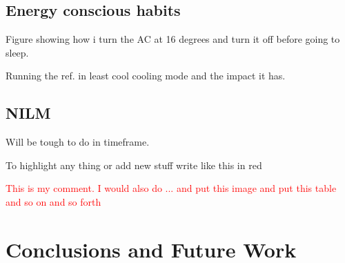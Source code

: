 \documentclass[10pt]{sensys-proc}
\newcommand{\redcolor}[1]{\textcolor{red}{#1}}
\begin{document}
\subsection{Energy conscious habits}
Figure showing how i turn the AC at 16 degrees and turn it off before going to sleep.

Running the ref. in least cool cooling mode and the impact it has.

\subsection{NILM}
Will be tough to do in timeframe.

To highlight any thing or add new stuff write like this in red

\redcolor{This is my comment. I would also do ... and put this image and put this table and so on and so forth}

\section{Conclusions and Future Work}


\balance

\end{document}
